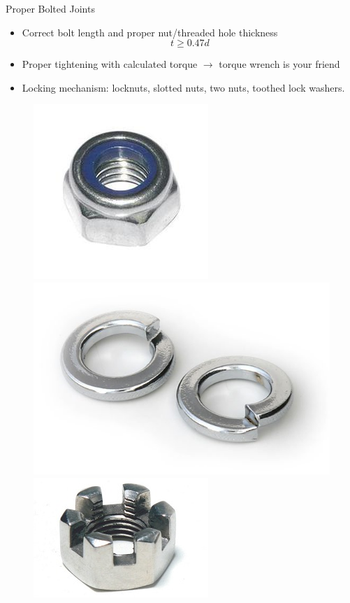 \documentclass[10pt, svgnames]{beamer}
\begin{document}
\begin{frame}[label={sec:orgb21d4cd}]{Proper Bolted Joints}
\begin{itemize}
\item Correct bolt length and proper nut/threaded hole thickness
  $$ t \geqslant 0.47d $$
\item Proper tightening with calculated torque $\rightarrow$ torque wrench is your friend
\item Locking mechanism: locknuts, slotted nuts, two nuts, toothed lock washers.
\end{itemize}
\begin{figure}[htbp]
  \centering
  \includegraphics[height=0.3\textheight]{pictures/locknut}
  \includegraphics[height=0.3\textheight]{pictures/lock-washer}
  \includegraphics[height=0.3\textheight]{pictures/slotted-nut}
\end{figure}
\end{frame}
\end{document}
